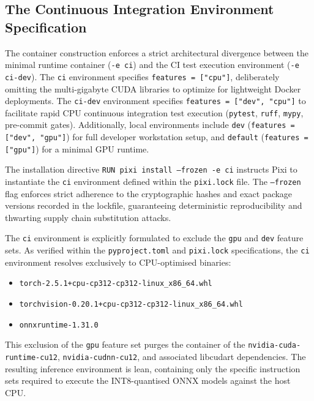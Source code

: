 \subsection{The Continuous Integration Environment Specification}

The container construction enforces a strict architectural divergence between the minimal runtime container (\texttt{-e ci}) and the CI test execution environment (\texttt{-e ci-dev}). The \texttt{ci} environment specifies \texttt{features = ["cpu"]}, deliberately omitting the multi-gigabyte CUDA libraries to optimize for lightweight Docker deployments. The \texttt{ci-dev} environment specifies \texttt{features = ["dev", "cpu"]} to facilitate rapid CPU continuous integration test execution (\texttt{pytest}, \texttt{ruff}, \texttt{mypy}, pre-commit gates). Additionally, local environments include \texttt{dev} (\texttt{features = ["dev", "gpu"]}) for full developer workstation setup, and \texttt{default} (\texttt{features = ["gpu"]}) for a minimal GPU runtime.

The installation directive \texttt{RUN pixi install --frozen -e ci} instructs Pixi to instantiate the \texttt{ci} environment defined within the \texttt{pixi.lock} file. The \texttt{--frozen} flag enforces strict adherence to the cryptographic hashes and exact package versions recorded in the lockfile, guaranteeing deterministic reproducibility and thwarting supply chain substitution attacks.

The \texttt{ci} environment is explicitly formulated to exclude the \texttt{gpu} and \texttt{dev} feature sets. As verified within the \texttt{pyproject.toml} and \texttt{pixi.lock} specifications, the \texttt{ci} environment resolves exclusively to CPU-optimised binaries:
\begin{itemize}
    \item \texttt{torch-2.5.1+cpu-cp312-cp312-linux\_x86\_64.whl}
    \item \texttt{torchvision-0.20.1+cpu-cp312-cp312-linux\_x86\_64.whl}
    \item \texttt{onnxruntime-1.31.0}
\end{itemize}

This exclusion of the \texttt{gpu} feature set purges the container of the \texttt{nvidia-cuda-runtime-cu12}, \texttt{nvidia-cudnn-cu12}, and associated libcudart dependencies. The resulting inference environment is lean, containing only the specific instruction sets required to execute the INT8-quantised ONNX models against the host CPU.

